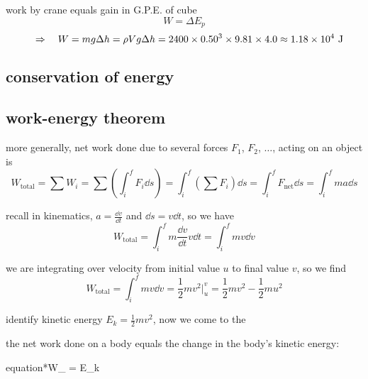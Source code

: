 
\begin{soln}
    
work by crane equals gain in G.P.E. of cube
\begin{equation*}
W = \Delta E_p 
\end{equation*}
\begin{equation*}
\quad \Rightarrow \quad W = mg\Delta h = \rho V g \Delta h = 2400 \times 0.50^3 \times 9.81 \times 4.0 \approx 1.18\times10^4 \text{ J} 
\end{equation*}
\end{soln}

\subsection{conservation of energy}\label{ch:conservation-of-energy}

\subsection{work-energy theorem \piste}

more generally, net work done due to several forces $F_1$, $F_2$, $\dots$, acting on an object is
\begin{equation*}
W_\text{total} = \sum W_i = \sum \left(\int_i^f F_i \dd s\right) = \int_i^f \left(\sum F_i \right)\dd s = \int_i^f F_\text{net} \dd s = \int_i^f ma \dd s
\end{equation*}

recall in kinematics, $a=\frac{\dd v}{\dd t}$ and $\dd s = v \dd t$, so we have
\begin{equation*}
W_\text{total} = \int_i^f m \frac{\dd v}{\dd t} v \dd t = \int_i^f m v \dd v
\end{equation*}

we are integrating over velocity from initial value $u$ to final value $v$, so we find
\begin{equation*}
W_\text{total} = \int_i^f m v \dd v = \frac{1}{2}mv^2 \Big|_u^v = \frac{1}{2}mv^2 - \frac{1}{2}mu^2
\end{equation*}

identify kinetic energy $E_k = \frac{1}{2}mv^2$, now we come to the   

\vspace*{-7pt}
\begin{ilight}
	the net work done on a body equals the change in the body's kinetic energy: \begin{empheq}[box=\tcbhighmath]{equation*}{W_ = \Delta E_k}\end{empheq}
\end{ilight}



